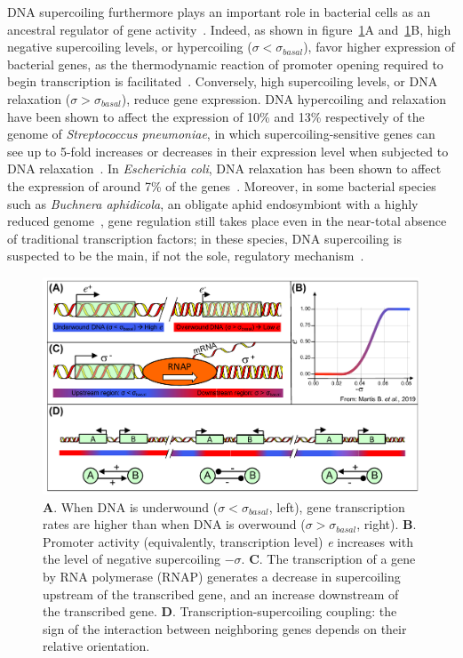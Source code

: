 DNA supercoiling furthermore plays an important role in bacterial cells as an ancestral regulator of gene activity~\citep{dorman2016}.
Indeed, as shown in figure~\ref{fig:alife:theory}A and~\ref{fig:alife:theory}B, high negative supercoiling levels, or hypercoiling ($\sigma < \sigma_{basal}$), favor higher expression of bacterial genes, as the thermodynamic reaction of promoter opening required to begin transcription is facilitated~\citep{elhoudaigui2019}.
Conversely, high supercoiling levels, or DNA relaxation ($\sigma > \sigma_{basal}$), reduce gene expression.
DNA hypercoiling and relaxation have been shown to affect the expression of 10\% and 13\% respectively of the genome of \emph{Streptococcus pneumoniae}, in which supercoiling-sensitive genes can see up to 5-fold increases or decreases in their expression level when subjected to DNA relaxation~\citep{delacampa2017}.
In \emph{Escherichia coli}, DNA relaxation has been shown to affect the expression of around 7\% of the genes~\citep{peter2004}.
Moreover, in some bacterial species such as \emph{Buchnera aphidicola}, an obligate aphid endosymbiont with a highly reduced genome~\citep{vinuelas2007}, gene regulation still takes place even in the near-total absence of traditional transcription factors; in these species, DNA supercoiling is suspected to be the main, if not the sole, regulatory mechanism~\citep{brinza2013}.

\begin{figure}[H]
  \centering
  \includegraphics[width=\textwidth]{alife/img/fig-theorique.pdf}
  \caption[Role of supercoiling in transcription, and description of the TSC]{\textbf{A}. When DNA is underwound ($\sigma < \sigma_{basal}$, left), gene transcription rates are higher than when DNA is overwound ($\sigma > \sigma_{basal}$, right).
  \textbf{B}. Promoter activity (equivalently, transcription level) \emph{e} increases with the level of negative supercoiling $-\sigma$.
  \textbf{C}. The transcription of a gene by RNA polymerase (RNAP) generates a decrease in supercoiling upstream of the transcribed gene, and an increase downstream of the transcribed gene.
  \textbf{D}. Transcription-supercoiling coupling: the sign of the interaction between neighboring genes depends on their relative orientation.}
  \label{fig:alife:theory}
\end{figure}


